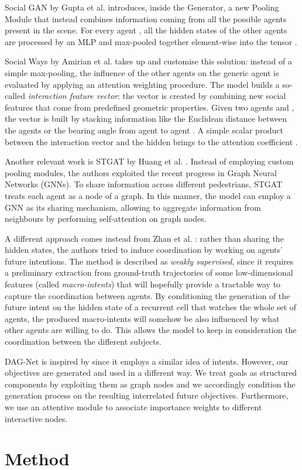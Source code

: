 \documentclass[10pt,a4paper,conference]{IEEEtran}
\begin{document}
Social GAN by Gupta et al. \cite{sgan} introduces, inside the Generator, a new Pooling Module that instead combines information coming from all the possible agents present in the scene. For every agent , all the hidden states  of the other agents are processed by an MLP and max-pooled together element-wise into the tensor .

Social Ways by Amirian et al. \cite{socialways} takes up and customise this solution: instead of a simple max-pooling, the influence of the other agents on the generic agent  is evaluated by applying an attention weighting procedure. The model builds a so-called \textit{interaction feature vector}: the  vector is created by combining new social features that come from predefined geometric properties. Given two agents  and , the vector is built by stacking information like the Euclidean distance between the agents or the bearing angle from agent  to agent . A simple scalar product between the  interaction vector and the hidden  brings to the attention coefficient .


Another relevant work is STGAT by Huang et al. \cite{stgat}. Instead of employing custom pooling modules, the authors exploited the recent progress in Graph Neural Networks (GNNs). To share information across different pedestrians, STGAT treats each agent as a node of a graph. In this manner, the model can employ a GNN \cite{gat} as its sharing mechanism, allowing to aggregate information from neighbours by performing self-attention \cite{attention_is_all_you_need} on graph nodes.

A different approach comes instead from Zhan et al. \cite{weeksup}: rather than sharing the hidden states, the authors tried to induce coordination by working on agents' future intentions. The method is described as \textit{weakly supervised}, since it requires a preliminary extraction from ground-truth trajectories of some low-dimensional features (called \textit{macro-intents}) that will hopefully provide a tractable way to capture the coordination between agents. By conditioning the generation of the future intent on the hidden state of a recurrent cell that watches the whole set of agents, the produced macro-intents will somehow be also influenced by what other agents are willing to do. This allows the model to keep in consideration the coordination between the different subjects.

DAG-Net is inspired by \cite{weeksup} since it employs a similar idea of intents. However, our objectives are generated and used in a different way. We treat goals as structured components by exploiting them as graph nodes and we accordingly condition the generation process on the resulting interrelated future objectives. Furthermore, we use an attentive module to associate importance weights to different interactive nodes. \section{Method}
\end{document}
